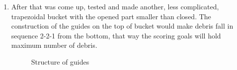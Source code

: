 \begin{enumerate}
  \item After that was come up, tested and made another, less complicated, trapezoidal bucket with the opened part smaller than closed. The construction of the guides on the top of bucket would make debris fall in sequence 2-2-1 from the bottom, that way the scoring goals will hold maximum number of debris.
  \begin{figure}[H]
  	\begin{minipage}[h]{0.31\linewidth}
  		\caption{Structure of guides}
  	\end{minipage}
  	\hfill
  	\begin{minipage}[h]{0.31\linewidth}

\end{minipage}
\end{figure}
\end{enumerate}
